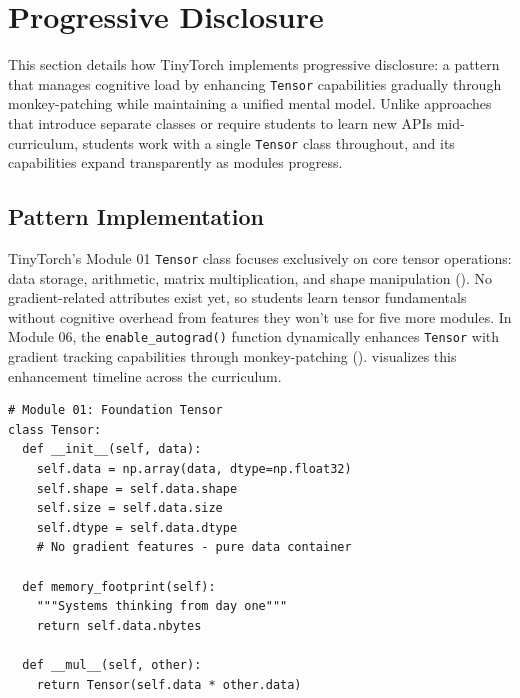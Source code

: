 \documentclass[10pt,twocolumn]{article}
\begin{document}
\section{Progressive Disclosure}
\label{sec:progressive}

This section details how TinyTorch implements progressive disclosure: a pattern that manages cognitive load by enhancing \texttt{Tensor} capabilities gradually through monkey-patching while maintaining a unified mental model. Unlike approaches that introduce separate classes or require students to learn new APIs mid-curriculum, students work with a single \texttt{Tensor} class throughout, and its capabilities expand transparently as modules progress.

\subsection{Pattern Implementation}

TinyTorch's Module 01 \texttt{Tensor} class focuses exclusively on core tensor operations: data storage, arithmetic, matrix multiplication, and shape manipulation (). No gradient-related attributes exist yet, so students learn tensor fundamentals without cognitive overhead from features they won't use for five more modules. In Module 06, the \texttt{enable\_autograd()} function dynamically enhances \texttt{Tensor} with gradient tracking capabilities through monkey-patching ().  visualizes this enhancement timeline across the curriculum.

\begin{lstlisting}[caption={\textbf{Foundation Tensor.} Module 01 Tensor focuses on core operations. No gradient infrastructure exists yet; students learn tensor fundamentals first.},label={lst:foundation-tensor},float=t]
# Module 01: Foundation Tensor
class Tensor:
  def __init__(self, data):
    self.data = np.array(data, dtype=np.float32)
    self.shape = self.data.shape
    self.size = self.data.size
    self.dtype = self.data.dtype
    # No gradient features - pure data container

  def memory_footprint(self):
    """Systems thinking from day one"""
    return self.data.nbytes

  def __mul__(self, other):
    return Tensor(self.data * other.data)
\end{lstlisting}
\end{document}
